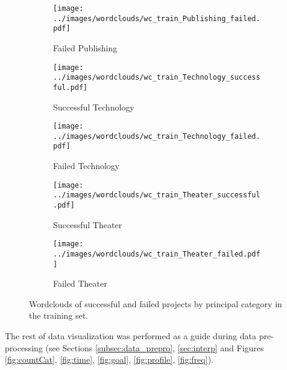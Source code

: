 \documentclass{article}
\begin{document}
\begin{itemize}
\begin{figure}
  \begin{subfigure}[m']{0.2\linewidth}
    \centering\texttt{[image: ../images/wordclouds/wc\_train\_Publishing\_failed.pdf]}
    \caption{Failed Publishing}
    \label{fig:Publishing_f}
  \end{subfigure}
    \begin{subfigure}[n]{0.2\linewidth}
    \centering\texttt{[image: ../images/wordclouds/wc\_train\_Technology\_successful.pdf]}
    \caption{Successful Technology}
    \label{fig:Technology_s}
  \end{subfigure} 
  \begin{subfigure}[n']{0.2\linewidth}
    \centering\texttt{[image: ../images/wordclouds/wc\_train\_Technology\_failed.pdf]}
    \caption{Failed Technology}
    \label{fig:Technology_f}
  \end{subfigure}
    \begin{subfigure}[o]{0.2\linewidth}
    \centering\texttt{[image: ../images/wordclouds/wc\_train\_Theater\_successful.pdf]}
    \caption{Successful Theater}
    \label{fig:Theater_s}
  \end{subfigure} 
  \begin{subfigure}[o']{0.2\linewidth}
    \centering\texttt{[image: ../images/wordclouds/wc\_train\_Theater\_failed.pdf]}
    \caption{Failed Theater}
    \label{fig:Theater_f}
  \end{subfigure}

\caption{Wordclouds of successful and failed projects by principal category in the training set.}
\label{fig:wordclouds}
\end{figure}

The rest of data visualization was performed as a guide during data pre-processing (see Sections \ref{subsec:data_prepro}, \ref{sec:interp} and Figures \ref{fig:countCat}, \ref{fig:time}, \ref{fig:goal},  \ref{fig:profile}, \ref{fig:freq}).

\end{itemize}
\end{document}
